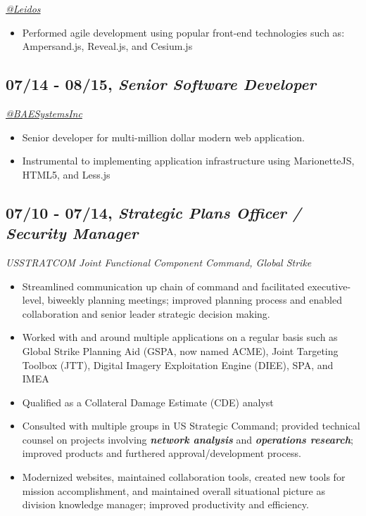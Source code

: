 \documentclass[10pt]{article}
\def\tightlist{}
\begin{document}
\emph{\href{https://twitter.com/LeidosInc}{@Leidos}}

\begin{itemize}
\tightlist
\item
  Performed agile development using popular front-end technologies such
  as: Ampersand.js, Reveal.js, and Cesium.js
\end{itemize}

\hypertarget{senior-software-developer-1}{%
\subsection{\texorpdfstring{07/14 - 08/15, \textbf{\emph{Senior Software
Developer}}}{07/14 - 08/15, Senior Software Developer}}\label{senior-software-developer-1}}

\emph{\href{https://twitter.com/BAESystemsInc}{@BAESystemsInc}}

\begin{itemize}
\tightlist
\item
  Senior developer for multi-million dollar modern web application.
\item
  Instrumental to implementing application infrastructure using
  MarionetteJS, HTML5, and Less.js
\end{itemize}

\hypertarget{strategic-plans-officer-security-manager}{%
\subsection{\texorpdfstring{07/10 - 07/14, \textbf{\emph{Strategic Plans
Officer / Security
Manager}}}{07/10 - 07/14, Strategic Plans Officer / Security Manager}}\label{strategic-plans-officer-security-manager}}

\emph{USSTRATCOM Joint Functional Component Command, Global Strike}

\begin{itemize}
\tightlist
\item
  Streamlined communication up chain of command and facilitated
  executive-level, biweekly planning meetings; improved planning process
  and enabled collaboration and senior leader strategic decision making.
\item
  Worked with and around multiple applications on a regular basis such
  as Global Strike Planning Aid (GSPA, now named ACME), Joint Targeting
  Toolbox (JTT), Digital Imagery Exploitation Engine (DIEE), SPA, and
  IMEA
\item
  Qualified as a Collateral Damage Estimate (CDE) analyst
\item
  Consulted with multiple groups in US Strategic Command; provided
  technical counsel on projects involving \textbf{\emph{network
  analysis}} and \textbf{\emph{operations research}}; improved products
  and furthered approval/development process.
\item
  Modernized websites, maintained collaboration tools, created new tools
  for mission accomplishment, and maintained overall situational picture
  as division knowledge manager; improved productivity and efficiency.
\end{itemize}
\end{document}
